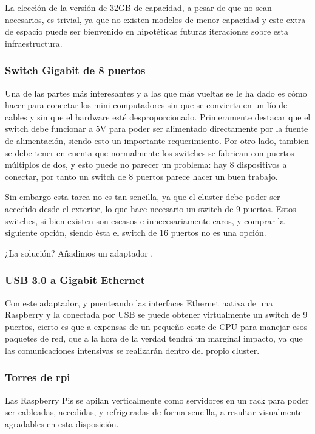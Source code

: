 La elección de la versión de 32GB de capacidad, a pesar de que no sean necesarios, es trivial, ya que no existen modelos de menor capacidad y este extra de espacio puede ser bienvenido en hipotéticas futuras iteraciones sobre esta infraestructura.


\subsubsection{Switch Gigabit de 8 puertos}
Una de las partes más interesantes y a las que más vueltas se le ha dado es cómo hacer para conectar los mini computadores sin que se convierta en un lío de cables y sin que el hardware esté desproporcionado. Primeramente destacar que el switch debe funcionar a 5V para poder ser alimentado directamente por la fuente de alimentación, siendo esto un importante requerimiento.
Por otro lado, tambien se debe tener en cuenta que normalmente los switches se fabrican con puertos múltiplos de dos, y esto puede no parecer un problema: hay 8 dispositivos a conectar, por tanto un switch de 8 puertos parece hacer un buen trabajo.


Sin embargo esta tarea no es tan sencilla, ya que el cluster debe poder ser accedido desde el exterior, lo que hace necesario un switch de 9 puertos. Estos switches, si bien existen son escasos e innecesariamente caros, y comprar la siguiente opción, siendo ésta el switch de 16 puertos no es una opción.

¿La solución? Añadimos un adaptador .

\subsubsection{USB 3.0 a Gigabit Ethernet}
\label{sssec:usb30age}
Con este adaptador, y puenteando las interfaces Ethernet nativa de una Raspberry y la conectada por USB se puede obtener virtualmente un switch de 9 puertos, cierto es que a expensas de un pequeño coste de CPU para manejar esos paquetes de red, que a la hora de la verdad tendrá un marginal impacto, ya que las comunicaciones intensivas se realizarán dentro del propio cluster.


\subsubsection{Torres de \acrshort{rpi}}
\label{sssec:torresrpi}
Las Raspberry Pis se apilan verticalmente como servidores en un rack para poder ser cableadas, accedidas, y refrigeradas de forma sencilla, a resultar visualmente agradables en esta disposición.

